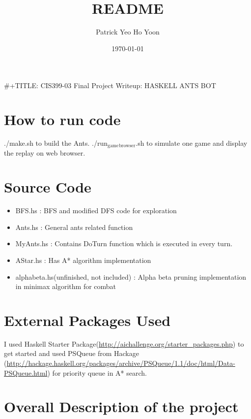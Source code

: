\documentclass[11pt]{article}
\title{README}
\author{Patrick Yeo Ho Yoon}
\date{\today}
\begin{document}
\maketitle

\setcounter{tocdepth}{3}
\tableofcontents
\vspace*{1cm}
 \#+TITLE: CIS399-03 Final Project Writeup: HASKELL ANTS BOT

\section{How to run code}
\label{sec-1}


./make.sh to build the Ants.
./run$_{\mathrm{game}}$$_{\mathrm{browser}}$.sh to simulate one game and display the replay on web browser.
\section{Source Code}
\label{sec-2}


\begin{itemize}
\item BFS.hs : BFS and modified DFS code for exploration
\item Ants.hs : General ants related function
\item MyAnts.hs : Contains DoTurn function which is executed in every turn.
\item AStar.hs : Has A* algorithm implementation
\item alphabeta.hs(unfinished, not included) : Alpha beta pruning implementation in minimax algorithm for combat
\end{itemize}
 
\section{External Packages Used}
\label{sec-3}


I used Haskell Starter Package(\href{http://aichallenge.org/starter_packages.php}{http://aichallenge.org/starter\_packages.php}) to get started and used PSQueue from Hackage (\href{http://hackage.haskell.org/packages/archive/PSQueue/1.1/doc/html/Data-PSQueue.html}{http://hackage.haskell.org/packages/archive/PSQueue/1.1/doc/html/Data-PSQueue.html}) for priority queue in A* search.
\section{Overall Description of the project}
\label{sec-4}
\end{document}
